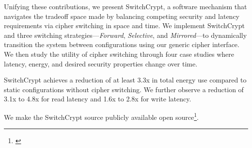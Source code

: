 Unifying these contributions, we present SwitchCrypt, a software mechanism that
navigates the tradeoff space made by balancing competing security and latency
requirements via cipher switching in space and time. We implement SwitchCrypt
and three switching strategies---\emph{Forward}, \emph{Selective}, and
\emph{Mirrored}---to dynamically transition the system between configurations
using our generic cipher interface. We then study the utility of cipher
switching through four case studies where latency, energy, and desired security
properties change over time.

SwitchCrypt achieves a reduction of at least 3.3x in total energy use compared
to static configurations without cipher switching. We further observe a
reduction of 3.1x to 4.8x for read latency and 1.6x to 2.8x for write latency.

We make the SwitchCrypt source publicly available open
source\footnote{\label{note1}\SystemURI}.
